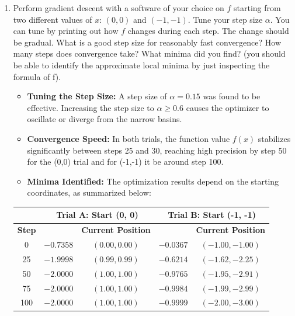 \documentclass[11pt]{article}
\begin{document}
\begin{enumerate}
\begin{enumerate}
\begin{center}
\begin{minipage}{0.8\textwidth}
\begin{verbatim}
					def grad_f(x):
					x1, x2 = x
					g1 = numpyObject.exp(-(x1 - 1)**2 - (x2 - 1)**2)
					g2 = numpyObject.exp(-(x1 + 2)**2 - (x2 + 3)**2)
					df_dx1 = 4 * (x1 - 1) * g1 + 2 * (x1 + 2) * g2
					df_dx2 = 4 * (x2 - 1) * g1 + 2 * (x2 + 3) * g2
					return numpyObject.array([df_dx1, df_dx2])
				\end{verbatim}
			\end{minipage}
			\end{center}
		\vspace{2cm}
		\item Perform gradient descent with a software of your choice on $f$ starting from two different values of $x$: $(0,0)$ and $(-1,-1)$. Tune your step size $\alpha$. You can tune by printing out how $f$ changes during each step. The change should be gradual. What is a good step size for reasonably fast convergence? How many steps does convergence take? What minima did you find? (you should be able to identify the approximate local minima by just inspecting the formula of f).
			\begin{itemize}
				\item \textbf{Tuning the Step Size:} A step size of $\alpha = 0.15$ was found to be effective. Increasing the step size to $\alpha \geq 0.6$ causes the optimizer to oscillate or diverge from the narrow basins.
				\item \textbf{Convergence Speed:} In both trials, the function value $f(x)$ stabilizes significantly between steps 25 and 30, reaching high precision by step 50 for the (0,0) trial and for (-1,-1) it be around step 100.
				\item \textbf{Minima Identified:} The optimization results depend on the starting coordinates, as summarized below:
			\end{itemize}
			
			\begin{center}
				\begin{tabular}{|c|cc|cc|}
					\hline
					& \multicolumn{2}{c|}{\textbf{Trial A: Start (0, 0)}} & \multicolumn{2}{c|}{\textbf{Trial B: Start (-1, -1)}} \\ \hline
					\textbf{Step} & \boldmath{$f(x)$} & \textbf{Current Position} & \boldmath{$f(x)$} & \textbf{Current Position} \\ \hline
					0   & $-0.7358$ & $(0.00, 0.00)$    & $-0.0367$ & $(-1.00, -1.00)$ \\ \hline
					25  & $-1.9998$ & $(0.99, 0.99)$    & $-0.6214$ & $(-1.62, -2.25)$ \\ \hline
					50  & $-2.0000$ & $(1.00, 1.00)$    & $-0.9765$ & $(-1.95, -2.91)$ \\ \hline
					75  & $-2.0000$ & $(1.00, 1.00)$    & $-0.9984$ & $(-1.99, -2.99)$ \\ \hline
					100 & $-2.0000$ & $(1.00, 1.00)$    & $-0.9999$ & $(-2.00, -3.00)$ \\ \hline
				\end{tabular}
			\end{center}
		\vspace{5cm}
		

\end{enumerate}
\end{enumerate}
\end{document}
